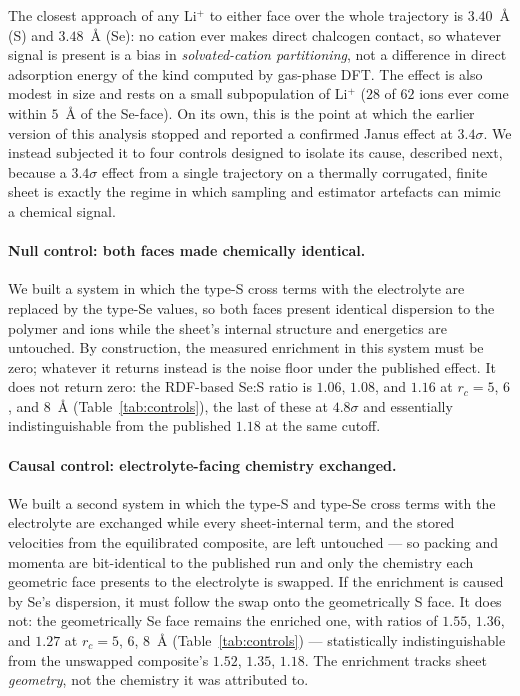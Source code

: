 \documentclass[review, 12pt]{elsarticle}
\numberwithin{equation}{section}
\newcommand{\Tab}[1] {Table~\ref{#1}}
\begin{document}
The closest approach of any Li$^+$ to either face over the whole trajectory is $3.40$~\AA{} (S) and $3.48$~\AA{} (Se): no cation ever makes direct chalcogen contact, so whatever signal is present is a bias in \emph{solvated-cation partitioning}, not a difference in direct adsorption energy of the kind computed by gas-phase DFT. The effect is also modest in size and rests on a small subpopulation of Li$^+$ ($28$ of $62$ ions ever come within $5$~\AA{} of the Se-face). On its own, this is the point at which the earlier version of this analysis stopped and reported a confirmed Janus effect at $3.4\sigma$. We instead subjected it to four controls designed to isolate its cause, described next, because a $3.4\sigma$ effect from a single trajectory on a thermally corrugated, finite sheet is exactly the regime in which sampling and estimator artefacts can mimic a chemical signal.

\paragraph{Null control: both faces made chemically identical.} We built a system in which the type-S cross terms with the electrolyte are replaced by the type-Se values, so both faces present identical dispersion to the polymer and ions while the sheet's internal structure and energetics are untouched. By construction, the measured enrichment in this system must be zero; whatever it returns instead is the noise floor under the published effect. It does not return zero: the RDF-based Se:S ratio is $1.06$, $1.08$, and $1.16$ at $r_c=5$, $6$, and $8$~\AA{} (\Tab{tab:controls}), the last of these at $4.8\sigma$ and essentially indistinguishable from the published $1.18$ at the same cutoff.

\paragraph{Causal control: electrolyte-facing chemistry exchanged.} We built a second system in which the type-S and type-Se cross terms with the electrolyte are exchanged while every sheet-internal term, and the stored velocities from the equilibrated composite, are left untouched --- so packing and momenta are bit-identical to the published run and only the chemistry each geometric face presents to the electrolyte is swapped. If the enrichment is caused by Se's dispersion, it must follow the swap onto the geometrically S face. It does not: the geometrically Se face remains the enriched one, with ratios of $1.55$, $1.36$, and $1.27$ at $r_c=5$, $6$, $8$~\AA{} (\Tab{tab:controls}) --- statistically indistinguishable from the unswapped composite's $1.52$, $1.35$, $1.18$. The enrichment tracks sheet \emph{geometry}, not the chemistry it was attributed to.
\end{document}
